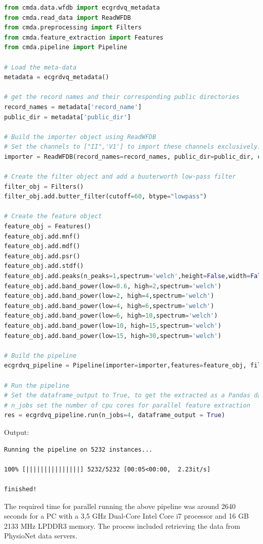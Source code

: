 \documentclass{article}
\begin{document}
\begin{lstlisting}[language=Python, caption=Multivariate feature extraction using one feature object]
from cmda.data.wfdb import ecgrdvq_metadata
from cmda.read_data import ReadWFDB
from cmda.preprocessing import Filters
from cmda.feature_extraction import Features
from cmda.pipeline import Pipeline

# Load the meta-data
metadata = ecgrdvq_metadata()

# get the record names and their corresponding public directories
record_names = metadata['record_name']
public_dir = metadata['public_dir']

# Build the importer object using ReadWFDB 
# Set the channels to ["II",'V1'] to import these channels exclusively. 
importer = ReadWFDB(record_names=record_names, public_dir=public_dir, channels=['II','V1'])

# Create the filter object and add a buuterworth low-pass filter
filter_obj = Filters()
filter_obj.add.butter_filter(cutoff=60, btype="lowpass")

# Create the feature object
feature_obj = Features()
feature_obj.add.mnf()
feature_obj.add.mdf()
feature_obj.add.psr()
feature_obj.add.stdf()
feature_obj.add.peaks(n_peaks=1,spectrum='welch',height=False,width=False,nperseg=512)
feature_obj.add.band_power(low=0.6, high=2,spectrum='welch')
feature_obj.add.band_power(low=2, high=4,spectrum='welch')
feature_obj.add.band_power(low=4, high=6,spectrum='welch')
feature_obj.add.band_power(low=6, high=10,spectrum='welch')
feature_obj.add.band_power(low=10, high=15,spectrum='welch')
feature_obj.add.band_power(low=15, high=30,spectrum='welch')

# Build the pipeline
ecgrdvq_pipeline = Pipeline(importer=importer,features=feature_obj, filters=filter_obj)

# Run the pipeline
# Set the dataframe_output to True, to get the extracted as a Pandas dataframe
# n_jobs set the number of cpu cores for parallel feature extraction
res = ecgrdvq_pipeline.run(n_jobs=4, dataframe_output = True)
\end{lstlisting}

Output:
\begin{lstlisting}
Running the pipeline on 5232 instances...

100% [|||||||||||||||] 5232/5232 [00:05<00:00,  2.23it/s]

finished!
\end{lstlisting}

The required time for parallel running the above pipeline was around 2640 seconds for a PC with a 3,5 GHz Dual-Core Intel Core i7 processor and 16 GB 2133 MHz LPDDR3 memory. The process included retrieving the data from PhysioNet data servers.
\end{document}
